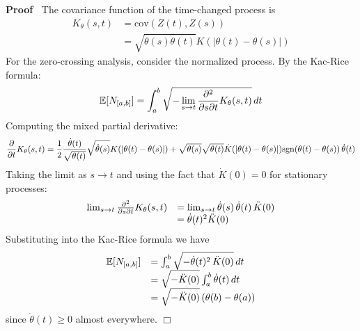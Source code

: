 \documentclass{article}
\newenvironment{proof}{\noindent\textbf{Proof\ }}{\hspace*{\fill}$\Box$\medskip}
\begin{document}
\begin{proof}
  The covariance function of the time-changed process is
  \begin{equation}
    \label{eq:time_changed_cov} \begin{array}{ll}
      K_{\theta} (s, t) & = \mathrm{cov} (Z (t), Z (s))\\
      & = \sqrt{\dot{\theta} (s) \dot{\theta} (t)} K (| \theta (t) - \theta
      (s) |)
    \end{array}
  \end{equation}
  For the zero-crossing analysis, consider the normalized process. By the
  Kac-Rice formula:
  \begin{equation}
    \label{eq:kac_rice_formula} \mathbb{E} [N_{[a, b]}] = \int_a^b \sqrt{-
    \lim_{s \to t}  \frac{\partial^2}{\partial s \partial t} K_{\theta} (s,
    t)}  \hspace{0.17em} dt
  \end{equation}
  Computing the mixed partial derivative:
  \begin{equation}
    \label{eq:mixed_partial} \frac{\partial}{\partial t} K_{\theta} (s, t) =
    \frac{1}{2}  \frac{\dot{\theta} (t)}{\sqrt{\theta (t)}} 
    \sqrt{\dot{\theta} (s)} K (| \theta (t) - \theta (s) |)
    \label{eq:mixed_partial_continued} + \sqrt{\theta (s)}  \sqrt{\theta (t)}
    \dot{K} (| \theta (t) - \theta (s) |) \mathrm{sgn} (\theta (t) - \theta
    (s)) \hspace{0.17em} \dot{\theta} (t)
  \end{equation}
  Taking the limit as $s \to t$ and using the fact that $\dot{K} (0) = 0$ for
  stationary processes:
  \begin{equation}
    \begin{array}{ll}
      \lim_{s \to t}  \frac{\partial^2}{\partial s \partial t} K_{\theta} (s,
      t) & = \lim_{s \to t} \dot{\theta} (s) \hspace{0.17em} \dot{\theta} (t) 
      \hspace{0.17em} \ddot{K} (0)\\
      & = \dot{\theta} (t)^2  \ddot{K} (0)
    \end{array} \label{eq:limit_mixed_partial}
  \end{equation}
  Substituting into the Kac-Rice formula we have
  \begin{equation}
    \label{eq:substituted_kac_rice} \begin{array}{ll}
      \mathbb{E} [N_{[a, b]}] & = \int_a^b \sqrt{- \dot{\theta} (t)^2 
      \hspace{0.17em} \ddot{K} (0)}  \hspace{0.17em} dt\\
      & = \sqrt{- \ddot{K} (0)}  \int_a^b \dot{\theta} (t)  \hspace{0.17em}
      dt\\
      & = \sqrt{- \ddot{K} (0)}  \hspace{0.17em} (\theta (b) - \theta (a))
    \end{array}
  \end{equation}
  since $\dot{\theta} (t) \geq 0$ almost everywhere.
\end{proof}
\end{document}
